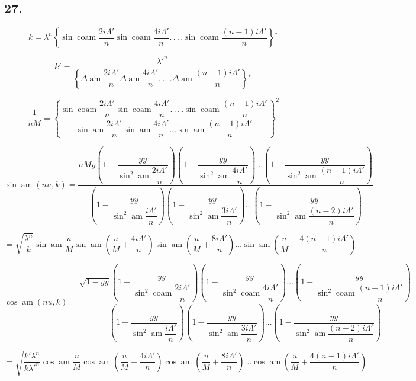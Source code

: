 \documentclass{article}
\begin{document}
\subsection*{27.}

\[
k=\lambda^{n}\left\{\sin\operatorname{coam}\frac{2i\Lambda'}{n}\sin\operatorname{coam}\frac{4i\Lambda'}{n}.\,.\,.\,.\sin\operatorname{coam}\frac{(n-1)i\Lambda'}{n}\right\}{}^{*}
\]

\[
k'=\frac{\lambda'^{n}}{\left\{\Delta\operatorname{am}\dfrac{2i\Lambda'}{n}\Delta\operatorname{am}\dfrac{4i\Lambda'}{n}.\,.\,.\,.\Delta\operatorname{am}\dfrac{(n-1)i\Lambda'}{n}\right\}{}^{*}}
\]

\[
\frac{1}{nM}=\left\{\frac{\sin\operatorname{coam}\dfrac{2i\Lambda'}{n}\sin\operatorname{coam}\dfrac{4i\Lambda'}{n}.\,.\,.\,.\sin\operatorname{coam}\dfrac{(n-1)i\Lambda'}{n}}{\sin\operatorname{am}\dfrac{2i\Lambda'}{n}\sin\operatorname{am}\dfrac{4i\Lambda'}{n}\ldots\sin\operatorname{am}\dfrac{(n-1)i\Lambda'}{n}}\right\}^{2}
\]

\[
\sin\operatorname{am}(nu,k)=\frac{nMy\left(1-\dfrac{yy}{\sin^{2}\operatorname{am}\dfrac{2i\Lambda'}{n}}\right)\left(1-\dfrac{yy}{\sin^{2}\operatorname{am}\dfrac{4i\Lambda'}{n}}\right)\ldots\left(1-\dfrac{yy}{\sin^{2}\operatorname{am}\dfrac{(n-1)i\Lambda'}{n}}\right)}{\left(1-\dfrac{yy}{\sin^{2}\operatorname{am}\dfrac{i\Lambda'}{n}}\right)\left(1-\dfrac{yy}{\sin^{2}\operatorname{am}\dfrac{3i\Lambda'}{n}}\right)\ldots\left(1-\dfrac{yy}{\sin^{2}\operatorname{am}\dfrac{(n-2)i\Lambda'}{n}}\right)}
\]

\[
=\sqrt{\frac{\lambda^{n}}{k}}\sin\operatorname{am}\frac{u}{M}\sin\operatorname{am}\left(\frac{u}{M}+\frac{4i\Lambda'}{n}\right)\sin\operatorname{am}\left(\frac{u}{M}+\frac{8i\Lambda'}{n}\right)\ldots\sin\operatorname{am}\left(\frac{u}{M}+\frac{4(n-1)i\Lambda'}{n}\right)
\]

\[
\cos\operatorname{am}(nu,k)=\frac{\sqrt{1-yy}\left(1-\dfrac{yy}{\sin^{2}\operatorname{coam}\dfrac{2i\Lambda'}{n}}\right)\left(1-\dfrac{yy}{\sin^{2}\operatorname{coam}\dfrac{4i\Lambda'}{n}}\right)\ldots\left(1-\dfrac{yy}{\sin^{2}\operatorname{coam}\dfrac{(n-1)i\Lambda'}{n}}\right)}{\left(1-\dfrac{yy}{\sin^{2}\operatorname{am}\dfrac{i\Lambda'}{n}}\right)\left(1-\dfrac{yy}{\sin^{2}\operatorname{am}\dfrac{3i\Lambda'}{n}}\right)\ldots\left(1-\dfrac{yy}{\sin^{2}\operatorname{am}\dfrac{(n-2)i\Lambda'}{n}}\right)}
\]

\[
=\sqrt{\frac{k'\lambda^{n}}{k\lambda'^{n}}}\cos\operatorname{am}\frac{u}{M}\cos\operatorname{am}\left(\frac{u}{M}+\frac{4i\Lambda'}{n}\right)\cos\operatorname{am}\left(\frac{u}{M}+\frac{8i\Lambda'}{n}\right)\ldots\cos\operatorname{am}\left(\frac{u}{M}+\frac{4(n-1)i\Lambda'}{n}\right)
\]
\end{document}
